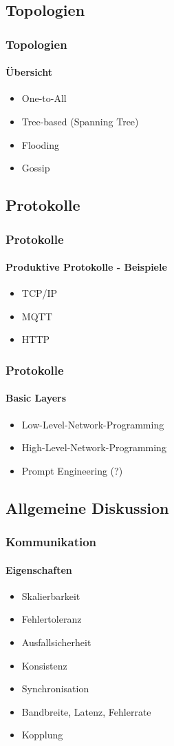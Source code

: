 \subsection{Topologien}
\begin{frame}
  \frametitle{Topologien}
  \framesubtitle{Übersicht}
  \begin{itemize}
    \item One-to-All
    \item Tree-based (Spanning Tree)
    \item Flooding
    \item Gossip
  \end{itemize}
\end{frame}

\subsection{Protokolle}
\begin{frame}
  \frametitle{Protokolle}
  \framesubtitle{Produktive Protokolle - Beispiele}
  \begin{itemize}
    \item TCP/IP
    \item MQTT
    \item HTTP
  \end{itemize}
\end{frame}

\begin{frame}
  \frametitle{Protokolle}
  \framesubtitle{Basic Layers}
  \begin{itemize}
    \item Low-Level-Network-Programming
    \item High-Level-Network-Programming 
    \item Prompt Engineering (?)
  \end{itemize}
\end{frame}

\subsection{Allgemeine Diskussion}
\begin{frame}
  \frametitle{Kommunikation}
  \framesubtitle{Eigenschaften}
  \begin{itemize}
    \item Skalierbarkeit
    \item Fehlertoleranz
    \item Ausfallsicherheit
    \item Konsistenz
    \item Synchronisation
    \item Bandbreite, Latenz, Fehlerrate
    \item Kopplung
  \end{itemize}
\end{frame}

